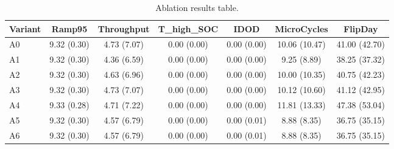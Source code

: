 \begin{table}[t]
\centering
\caption{Ablation results table.}
\label{tab:ablation_auto}
\begin{tabular}{lcccccc}
\toprule
Variant & Ramp95 & Throughput & T\_high\_SOC & IDOD & MicroCycles & FlipDay \\
\midrule
A0 & 9.32 (0.30) & 4.73 (7.07) & 0.00 (0.00) & 0.00 (0.00) & 10.06 (10.47) & 41.00 (42.70) \\
A1 & 9.32 (0.30) & 4.36 (6.59) & 0.00 (0.00) & 0.00 (0.00) & 9.25 (8.89) & 38.25 (37.32) \\
A2 & 9.32 (0.30) & 4.63 (6.96) & 0.00 (0.00) & 0.00 (0.00) & 10.00 (10.35) & 40.75 (42.23) \\
A3 & 9.32 (0.30) & 4.73 (7.07) & 0.00 (0.00) & 0.00 (0.00) & 10.12 (10.60) & 41.12 (42.95) \\
A4 & 9.33 (0.28) & 4.71 (7.22) & 0.00 (0.00) & 0.00 (0.00) & 11.81 (13.33) & 47.38 (53.04) \\
A5 & 9.32 (0.30) & 4.57 (6.79) & 0.00 (0.00) & 0.00 (0.01) & 8.88 (8.35) & 36.75 (35.15) \\
A6 & 9.32 (0.30) & 4.57 (6.79) & 0.00 (0.00) & 0.00 (0.01) & 8.88 (8.35) & 36.75 (35.15) \\
\bottomrule
\end{tabular}
\end{table}